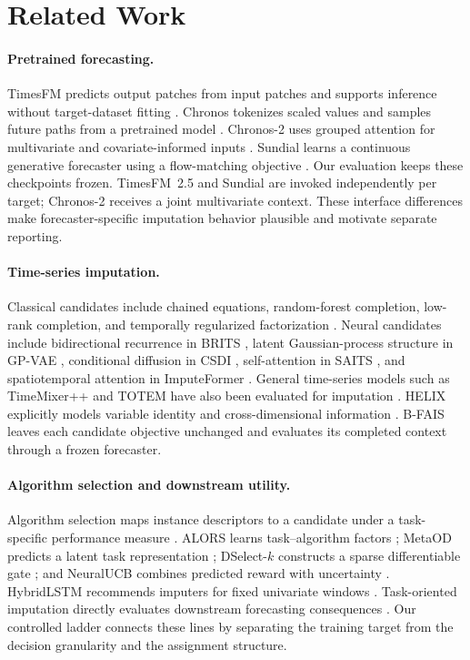 \documentclass{article}
\newcommand{\bfais}{\textsc{B-FAIS}\xspace}
\begin{document}
\section{Related Work}
\label{sec:related}

\paragraph{Pretrained forecasting.}
TimesFM predicts output patches from input patches and supports inference without target-dataset fitting \citep{das2024timesfm}. Chronos tokenizes scaled values and samples future paths from a pretrained model \citep{ansari2024chronos}. Chronos-2 uses grouped attention for multivariate and covariate-informed inputs \citep{ansari2025chronos2}. Sundial learns a continuous generative forecaster using a flow-matching objective \citep{liu2025sundial}. Our evaluation keeps these checkpoints frozen. TimesFM~2.5 and Sundial are invoked independently per target; Chronos-2 receives a joint multivariate context. These interface differences make forecaster-specific imputation behavior plausible and motivate separate reporting.

\paragraph{Time-series imputation.}
Classical candidates include chained equations, random-forest completion, low-rank completion, and temporally regularized factorization \citep{vanbuuren2011mice,stekhoven2012missforest,mazumder2010softimpute,yu2016trmf}. Neural candidates include bidirectional recurrence in BRITS \citep{cao2018brits}, latent Gaussian-process structure in GP-VAE \citep{fortuin2020gpvae}, conditional diffusion in CSDI \citep{tashiro2021csdi}, self-attention in SAITS \citep{du2023saits}, and spatiotemporal attention in ImputeFormer \citep{nie2024imputeformer}. General time-series models such as TimeMixer++ and TOTEM have also been evaluated for imputation \citep{wang2025timemixerpp,talukder2024totem}. HELIX explicitly models variable identity and cross-dimensional information \citep{zhang2026helix}. \bfais leaves each candidate objective unchanged and evaluates its completed context through a frozen forecaster.

\paragraph{Algorithm selection and downstream utility.}
Algorithm selection maps instance descriptors to a candidate under a task-specific performance measure \citep{rice1976algorithm}. ALORS learns task--algorithm factors \citep{misir2017alors}; MetaOD predicts a latent task representation \citep{zhao2021automatic}; DSelect-$k$ constructs a sparse differentiable gate \citep{hazimeh2021dselect}; and NeuralUCB combines predicted reward with uncertainty \citep{zhou2020neuralucb}. HybridLSTM recommends imputers for fixed univariate windows \citep{almeida2025hybridlstm}. Task-oriented imputation directly evaluates downstream forecasting consequences \citep{wang2024taskoriented}. Our controlled ladder connects these lines by separating the training target from the decision granularity and the assignment structure.
\end{document}

